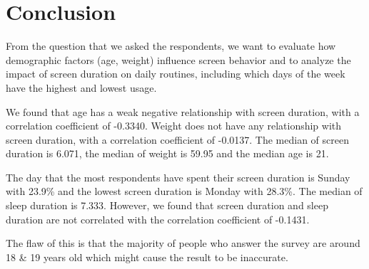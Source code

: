 \chapter*{Conclusion}
From the question that we asked the respondents, we want to evaluate how demographic factors (age, weight) influence screen behavior and to analyze the impact of screen duration on daily routines, including which days of the week have the highest and lowest usage.\\ \par
We found that age has a weak negative relationship with screen duration, with a correlation coefficient of -0.3340. Weight does not have any relationship with screen duration, with a correlation coefficient of -0.0137. The median of screen duration is 6.071, the median of weight is 59.95 and the median age is 21.\\ \par
The day that the most respondents have spent their screen duration is Sunday with 23.9\% and the lowest screen duration is Monday with 28.3\%. The median of sleep duration is 7.333. However, we found that screen duration and sleep duration are not correlated with the correlation coefficient of -0.1431.\\\par
The flaw of this is that the majority of people who answer the survey are around 18 & 19 years old which might cause the result to be inaccurate.
